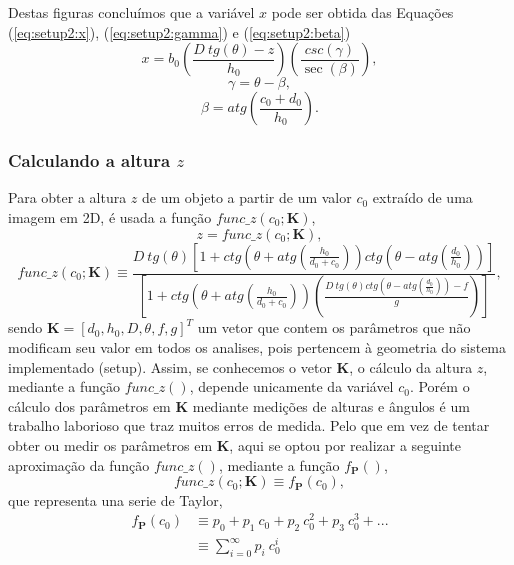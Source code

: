 \documentclass[a4paper, 12pt]{article}
\begin{document}
Destas figuras concluímos que a variável $x$ pode ser obtida das Equações (\ref{eq:setup2:x}), 
 (\ref{eq:setup2:gamma}) e (\ref{eq:setup2:beta})
\begin{equation}\label{eq:setup2:x}
x=b_0\left(\frac{D~tg(\theta)-z}{h_0}\right)\left(\frac{csc\left({\gamma}\right) }{\sec\left(\beta\right)}\right),
\end{equation}
\begin{equation}\label{eq:setup2:gamma}
\gamma=\theta-\beta,
\end{equation}
\begin{equation}\label{eq:setup2:beta}
\beta=atg\left(\frac{c_0+d_0}{h_0}\right).
\end{equation}

\subsubsection{Calculando a altura $z$}
Para obter a altura $z$ de um objeto a partir de um valor $c_0$ 
extraído de uma imagem em 2D, é usada a função
$func\_z(c_0;\mathbf{K})$, 
\begin{equation}
z = func\_z(c_0;\mathbf{K}),
\end{equation}
\begin{equation}\label{eq:setupz1}
func\_z(c_0;\mathbf{K})\equiv\frac{
D~tg(\theta)
\left[
1+ ctg\left(\theta+atg\left(\frac{h_0}{d_0+c_0}\right)\right) ctg\left(\theta-atg\left(\frac{d_0}{h_0}\right)\right) 
\right]
}{
\left[1+ctg\left(\theta+atg\left(\frac{h_0}{d_0+c_0}\right)\right) \left(\frac{D~tg(\theta)ctg\left(\theta-atg\left(\frac{d_0}{h_0}\right)\right)- f}{g}\right)\right]
},
\end{equation}
sendo $\mathbf{K}=[d_0,h_0,D,\theta,f,g]^T$
um vetor que contem os parâmetros que não modificam seu valor em todos os analises,
pois pertencem à geometria do sistema implementado (setup).
Assim, se conhecemos o vetor $\mathbf{K}$, o cálculo da altura $z$, mediante a função $func\_z()$,
depende unicamente da variável $c_0$.
Porém o cálculo dos parâmetros em $\mathbf{K}$ mediante medições de alturas e ângulos
é um trabalho laborioso que traz muitos erros de medida.
Pelo que em vez de tentar obter ou medir os parâmetros em $\mathbf{K}$,
aqui se optou por realizar a seguinte aproximação da função $func\_z()$, 
mediante a função $f_{\mathbf{P}}()$, 
\begin{equation}
func\_z(c_0;\mathbf{K})\equiv f_{\mathbf{P}}(c_0),
\end{equation}
que representa una serie de Taylor,
\begin{equation}
\begin{align*}
f_{\mathbf{P}}(c_0)  &\equiv p_0+p_1~c_0+p_2~c_0^2+p_3~c_0^3+...\\ 
 &\equiv \sum_{i=0}^{\infty}p_i~c_0^i
\end{align*}
\end{equation}
\end{document}

